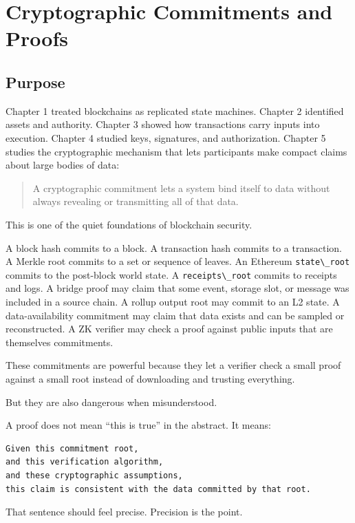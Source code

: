 \chapter{Cryptographic Commitments and Proofs}

\section{Purpose}

Chapter 1 treated blockchains as replicated state machines. Chapter 2
identified assets and authority. Chapter 3 showed how transactions carry
inputs into execution. Chapter 4 studied keys, signatures, and authorization. Chapter 5 studies the cryptographic
mechanism that lets participants make compact claims about large bodies
of data:

\begin{quote}
A cryptographic commitment lets a system bind itself to data without
always revealing or transmitting all of that data.
\end{quote}

This is one of the quiet foundations of blockchain security.

A block hash commits to a block. A transaction hash commits to a
transaction. A Merkle root commits to a set or sequence of leaves. An
Ethereum \passthrough{\lstinline!state\_root!} commits to the post-block
world state. A \passthrough{\lstinline!receipts\_root!} commits to
receipts and logs. A bridge proof may claim that some event, storage
slot, or message was included in a source chain. A rollup output root
may commit to an L2 state. A data-availability commitment may claim that
data exists and can be sampled or reconstructed. A ZK verifier may check
a proof against public inputs that are themselves commitments.

These commitments are powerful because they let a verifier check a small
proof against a small root instead of downloading and trusting
everything.

But they are also dangerous when misunderstood.

A proof does not mean ``this is true'' in the abstract. It means:

\begin{lstlisting}
Given this commitment root,
and this verification algorithm,
and these cryptographic assumptions,
this claim is consistent with the data committed by that root.
\end{lstlisting}

That sentence should feel precise. Precision is the point.

